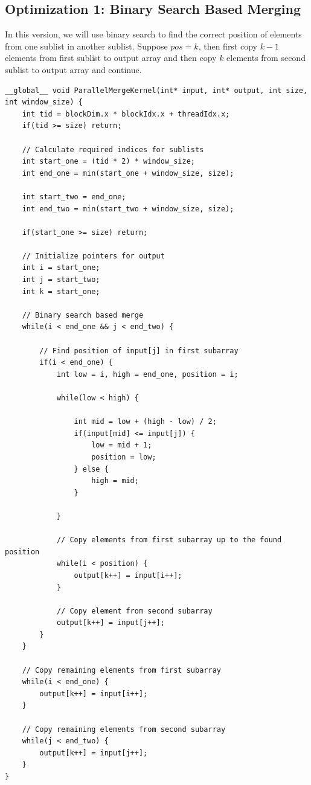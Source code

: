 \documentclass{article}
\begin{document}
\subsection*{Optimization 1: Binary Search Based Merging}
In this version, we will use binary search to find the correct position of elements from one sublist in another sublist. Suppose $pos = k$, then first copy $k-1$ elements from first sublist to output array and then copy $k$ elements from second sublist to output array and continue.


\begin{lstlisting}
__global__ void ParallelMergeKernel(int* input, int* output, int size, int window_size) {
    int tid = blockDim.x * blockIdx.x + threadIdx.x;
    if(tid >= size) return;

    // Calculate required indices for sublists
    int start_one = (tid * 2) * window_size;
    int end_one = min(start_one + window_size, size);

    int start_two = end_one;
    int end_two = min(start_two + window_size, size);

    if(start_one >= size) return;

    // Initialize pointers for output
    int i = start_one;
    int j = start_two;
    int k = start_one;

    // Binary search based merge
    while(i < end_one && j < end_two) {

        // Find position of input[j] in first subarray
        if(i < end_one) {
            int low = i, high = end_one, position = i;
            
            while(low < high) {
                
                int mid = low + (high - low) / 2;
                if(input[mid] <= input[j]) {
                    low = mid + 1;
                    position = low;
                } else {
                    high = mid;
                }
                
            }
            
            // Copy elements from first subarray up to the found position
            while(i < position) {
                output[k++] = input[i++];
            }
            
            // Copy element from second subarray
            output[k++] = input[j++];
        }
    }

    // Copy remaining elements from first subarray
    while(i < end_one) {
        output[k++] = input[i++];
    }

    // Copy remaining elements from second subarray
    while(j < end_two) {
        output[k++] = input[j++];
    }
}
\end{lstlisting}
\end{document}

